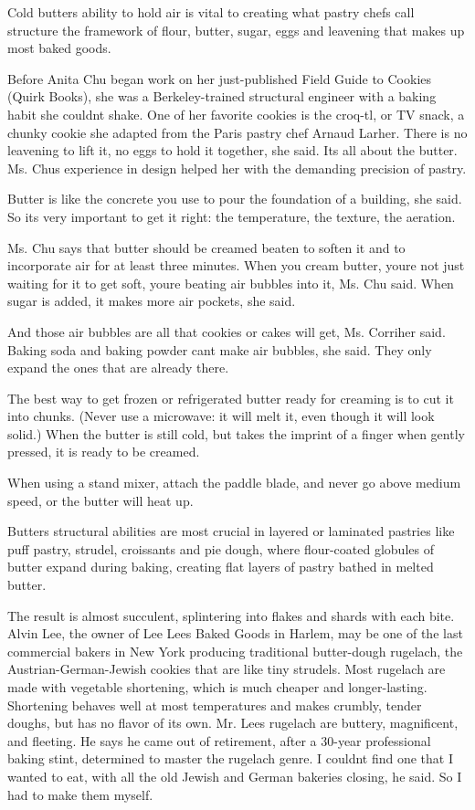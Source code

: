 \documentclass[12pt,landscape,twoside,twocolumn, openright, titlepage, draft]{book}
\begin{document}
Cold butters ability to hold air is vital to creating what pastry chefs call structure  the framework of flour, butter, sugar, eggs and leavening that makes up most baked goods.

Before Anita Chu began work on her just-published Field Guide to Cookies (Quirk Books), she was a Berkeley-trained structural engineer with a baking habit she couldnt shake. One of her favorite cookies is the croq-tl, or TV snack, a chunky cookie she adapted from the Paris pastry chef Arnaud Larher. There is no leavening to lift it, no eggs to hold it together, she said. Its all about the butter. Ms. Chus experience in design helped her with the demanding precision of pastry.

Butter is like the concrete you use to pour the foundation of a building, she said. So its very important to get it right: the temperature, the texture, the aeration.

Ms. Chu says that butter should be creamed  beaten to soften it and to incorporate air  for at least three minutes. When you cream butter, youre not just waiting for it to get soft, youre beating air bubbles into it, Ms. Chu said. When sugar is added, it makes more air pockets, she said.

And those air bubbles are all that cookies or cakes will get, Ms. Corriher said. Baking soda and baking powder cant make air bubbles, she said. They only expand the ones that are already there.

The best way to get frozen or refrigerated butter ready for creaming is to cut it into chunks. (Never use a microwave: it will melt it, even though it will look solid.) When the butter is still cold, but takes the imprint of a finger when gently pressed, it is ready to be creamed.

When using a stand mixer, attach the paddle blade, and never go above medium speed, or the butter will heat up.

Butters structural abilities are most crucial in layered or laminated pastries like puff pastry, strudel, croissants and pie dough, where flour-coated globules of butter expand during baking, creating flat layers of pastry bathed in melted butter.

The result is almost succulent, splintering into flakes and shards with each bite. Alvin Lee, the owner of Lee Lees Baked Goods in Harlem, may be one of the last commercial bakers in New York producing traditional butter-dough rugelach, the Austrian-German-Jewish cookies that are like tiny strudels. Most rugelach are made with vegetable shortening, which is much cheaper and longer-lasting. Shortening behaves well at most temperatures and makes crumbly, tender doughs, but has no flavor of its own. Mr. Lees rugelach are buttery, magnificent, and fleeting. He says he came out of retirement, after a 30-year professional baking stint, determined to master the rugelach genre. I couldnt find one that I wanted to eat, with all the old Jewish and German bakeries closing, he said. So I had to make them myself.
\end{document}
